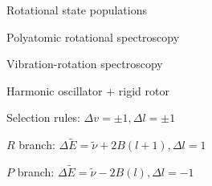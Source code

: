 \message{ !name(Outline.tex)}\documentclass[11pt]{article}
\begin{document}
\begin{outline}
\begin{outline}
\begin{outline}
    \item Rotational state populations
    \end{outline}
  \item{Polyatomic rotational spectroscopy}
  \item{Vibration-rotation spectroscopy}
    \begin{outline}
    \item Harmonic oscillator + rigid rotor
    \item Selection rules: $\Delta v = \pm 1, \Delta l=\pm 1$
    \item $R$ branch: $\Delta \tilde E  = \tilde \nu + 2B(l+1), \Delta l = 1$ 
    \item $P$ branch: $\Delta \tilde E = \tilde \nu - 2B(l), \Delta l = -1$       
    \end{outline}


\end{outline}
\end{outline}
\end{document}
